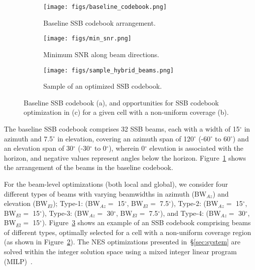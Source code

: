 \begin{figure*}%
\centering
\begin{subfigure}[b]{0.34\linewidth}
    \texttt{[image: figs/baseline\_codebook.png]}
    \caption{Baseline SSB codebook arrangement.}
    \label{fig:baseline_codebook}
\end{subfigure}
\hfill
\begin{subfigure}[b]{0.31\linewidth}
    \texttt{[image: figs/min\_snr.png]}
    \caption{Minimum SNR along beam directions.}
    \label{fig:min_snr}
\end{subfigure}
\hfill
\begin{subfigure}[b]{0.31\linewidth}
   \texttt{[image: figs/sample\_hybrid\_beams.png]}
\caption{Sample of an optimized SSB codebook.}
    \label{fig:sample_hybrid_beam}
\end{subfigure}
\caption{Baseline SSB codebook (a), and opportunities for SSB codebook optimization in (c) for a given cell with a non-uniform coverage (b).}
\label{fig:beam_per_sector}
\vspace{-15pt}
\end{figure*}

The baseline SSB codebook comprises 32 SSB beams, each with a width of 15$^{\circ}$ in azimuth and 7.5$^{\circ}$ in elevation, covering an azimuth span of   120$^{\circ}$ (-60$^{\circ}$ to 60$^{\circ}$) and an elevation span of 30$^{\circ}$ (-30$^{\circ}$ to 0$^{\circ}$), wherein 0$^{\circ}$ elevation is associated with the horizon, and negative values represent angles below the horizon. Figure~\ref{fig:baseline_codebook} shows the arrangement of the beams in the baseline codebook.

For the beam-level optimizations (both local and global), we consider four different types of beams with varying beamwidths in azimuth (BW$_{Az}$) and elevation (BW$_{El}$); Type-1: (BW$_{Az} =$ 15$^{\circ}$, BW$_{El} =$ 7.5$^{\circ}$), 
Type-2: (BW$_{Az} =$ 15$^{\circ}$, BW$_{El} =$ 15$^{\circ}$),
Type-3: (BW$_{Az} =$ 30$^{\circ}$, BW$_{El} =$ 7.5$^{\circ}$), and
Type-4: (BW$_{Az} =$ 30$^{\circ}$, BW$_{El} =$ 15$^{\circ}$).
Figure~\ref{fig:sample_hybrid_beam} shows an example of an SSB codebook comprising beams of different types, optimally selected for a cell with a non-uniform coverage region (as shown in Figure~\ref{fig:min_snr}).
The NES optimizations presented in~\S\ref{sec:system} are solved within the integer solution space using a mixed integer linear program (MILP)~\cite{10.1287/ijoc.2018.0857}.
